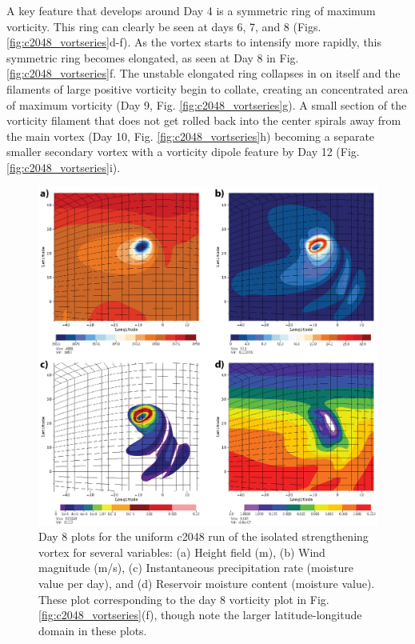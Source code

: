   A key feature that 
   develops around Day 4 is a symmetric ring of maximum vorticity. This ring can clearly 
   be seen at days 6, 7, and 8 (Figs. \ref{fig:c2048_vortseries}d-f). As the vortex starts 
   to intensify more rapidly, this symmetric ring becomes elongated, as
   seen at Day 8 in Fig. \ref{fig:c2048_vortseries}f. The unstable elongated ring 
   collapses in on itself and the filaments of large positive vorticity begin to collate,
   creating an concentrated area of maximum vorticity (Day 9, Fig. \ref{fig:c2048_vortseries}g). 
   A small section of the vorticity filament that does not get rolled back into the center spirals
   away from the main vortex (Day 10, Fig. \ref{fig:c2048_vortseries}h) becoming a separate
   smaller secondary vortex with a vorticity dipole feature by 
   Day 12 (Fig. \ref{fig:c2048_vortseries}i).

\begin{figure}
    \centerline{%
    \noindent
    \includegraphics[width=\textwidth]{Chap2/c2048_day8_plots-01.eps}}
   \caption{Day 8 plots for the uniform c2048 run of the isolated strengthening vortex for several variables: 
   (a) Height field (m), (b) Wind magnitude (m/s), (c) Instantaneous precipitation rate (moisture value per day), 
   and (d) Reservoir moisture content (moisture value).
   These plot corresponding to the day 8 vorticity plot in Fig. \ref{fig:c2048_vortseries}(f), though
    note the larger latitude-longitude domain in these plots. }%
    \label{fig:c2048_day8}
\end{figure}
    
